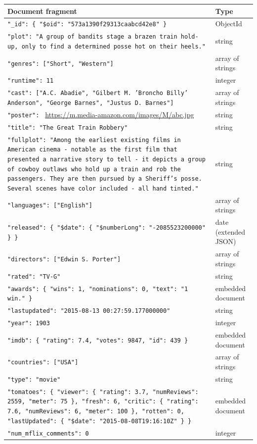 \documentclass[9pt]{article}
\begin{document}
\small
\begin{tabular}{p{} p{}}
\textbf{Document fragment} & \textbf{Type} \\ \hline
\texttt{"\_id": \{ "\$oid": "573a1390f29313caabcd42e8" \}} & ObjectId \\
\texttt{"plot": "A group of bandits stage a brazen train hold-up, only to find a determined posse hot on their heels."} & string \\
\texttt{"genres": ["Short", "Western"]} & array of strings \\
\texttt{"runtime": 11} & integer \\
\texttt{"cast": ["A.C. Abadie", "Gilbert M. 'Broncho Billy' Anderson", "George Barnes", "Justus D. Barnes"]} & array of strings \\
\texttt{"poster": }%
\url{https://m.media-amazon.com/images/M/abc.jpg} & string \\
\texttt{"title": "The Great Train Robbery"} & string \\
\texttt{"fullplot": "Among the earliest existing films in American cinema - notable as the first film that presented a narrative story to tell - it depicts a group of cowboy outlaws who hold up a train and rob the passengers. They are then pursued by a Sheriff's posse. Several scenes have color included - all hand tinted."} & string \\
\texttt{"languages": ["English"]} & array of strings \\
\texttt{"released": \{ "\$date": \{ "\$numberLong": "-2085523200000" \} \}} & date (extended JSON) \\
\texttt{"directors": ["Edwin S. Porter"]} & array of strings \\
\texttt{"rated": "TV-G"} & string \\
\texttt{"awards": \{ "wins": 1, "nominations": 0, "text": "1 win." \}} & embedded document \\
\texttt{"lastupdated": "2015-08-13 00:27:59.177000000"} & string \\
\texttt{"year": 1903} & integer \\
\texttt{"imdb": \{ "rating": 7.4, "votes": 9847, "id": 439 \}} & embedded document \\
\texttt{"countries": ["USA"]} & array of strings \\
\texttt{"type": "movie"} & string \\
\texttt{"tomatoes": \{ "viewer": \{ "rating": 3.7, "numReviews": 2559, "meter": 75 \}, "fresh": 6, "critic": \{ "rating": 7.6, "numReviews": 6, "meter": 100 \}, "rotten": 0, "lastUpdated": \{ "\$date": "2015-08-08T19:16:10Z" \} \}} & embedded document \\
\texttt{"num\_mflix\_comments": 0} & integer \\
\end{tabular}
\end{document}
